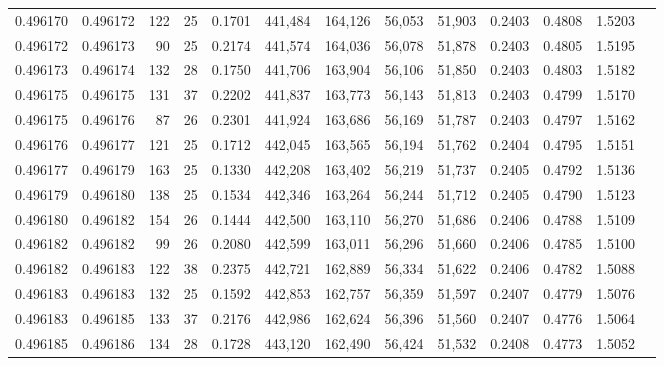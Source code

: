 \begin{tabular}{rrrrrrrrrrrrr}
0.496170 & 0.496172 & 122 &  25 &                                     0.1701 & 441,484 & 164,126 &  56,053 &  51,903 & 0.2403 & 0.4808 & 1.5203 \\
0.496172 & 0.496173 &  90 &  25 &                                     0.2174 & 441,574 & 164,036 &  56,078 &  51,878 & 0.2403 & 0.4805 & 1.5195 \\
0.496173 & 0.496174 & 132 &  28 &                                     0.1750 & 441,706 & 163,904 &  56,106 &  51,850 & 0.2403 & 0.4803 & 1.5182 \\
0.496175 & 0.496175 & 131 &  37 &                                     0.2202 & 441,837 & 163,773 &  56,143 &  51,813 & 0.2403 & 0.4799 & 1.5170 \\
0.496175 & 0.496176 &  87 &  26 &                                     0.2301 & 441,924 & 163,686 &  56,169 &  51,787 & 0.2403 & 0.4797 & 1.5162 \\
0.496176 & 0.496177 & 121 &  25 &                                     0.1712 & 442,045 & 163,565 &  56,194 &  51,762 & 0.2404 & 0.4795 & 1.5151 \\
0.496177 & 0.496179 & 163 &  25 &                                     0.1330 & 442,208 & 163,402 &  56,219 &  51,737 & 0.2405 & 0.4792 & 1.5136 \\
0.496179 & 0.496180 & 138 &  25 &                                     0.1534 & 442,346 & 163,264 &  56,244 &  51,712 & 0.2405 & 0.4790 & 1.5123 \\
0.496180 & 0.496182 & 154 &  26 &                                     0.1444 & 442,500 & 163,110 &  56,270 &  51,686 & 0.2406 & 0.4788 & 1.5109 \\
0.496182 & 0.496182 &  99 &  26 &                                     0.2080 & 442,599 & 163,011 &  56,296 &  51,660 & 0.2406 & 0.4785 & 1.5100 \\
0.496182 & 0.496183 & 122 &  38 &                                     0.2375 & 442,721 & 162,889 &  56,334 &  51,622 & 0.2406 & 0.4782 & 1.5088 \\
0.496183 & 0.496183 & 132 &  25 &                                     0.1592 & 442,853 & 162,757 &  56,359 &  51,597 & 0.2407 & 0.4779 & 1.5076 \\
0.496183 & 0.496185 & 133 &  37 &                                     0.2176 & 442,986 & 162,624 &  56,396 &  51,560 & 0.2407 & 0.4776 & 1.5064 \\
0.496185 & 0.496186 & 134 &  28 &                                     0.1728 & 443,120 & 162,490 &  56,424 &  51,532 & 0.2408 & 0.4773 & 1.5052 \\

\end{tabular}
